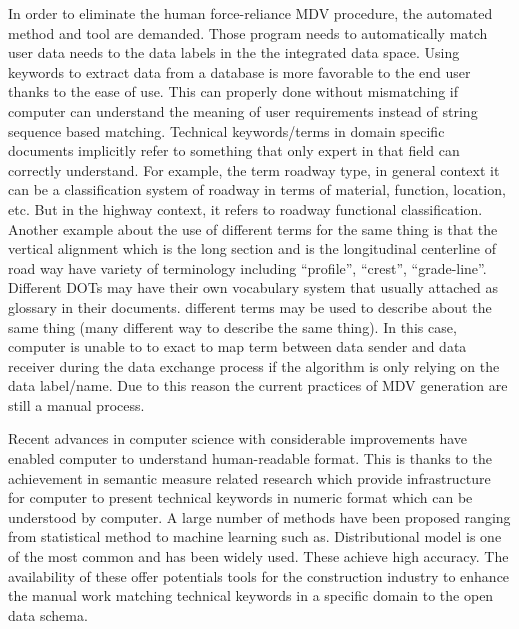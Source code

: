 \documentclass[Journal, InsideFigs, DoubleSpace]{ascelike} %
\begin{document}
In order to eliminate the human force-reliance MDV procedure, the automated method and tool are demanded. Those program needs to automatically match user data needs to the data labels in the the integrated data space. Using keywords to extract data from a database is more favorable to the end user thanks to the ease of use. This can properly done without mismatching if computer can understand the meaning of user requirements instead of string sequence based matching. Technical keywords/terms in domain specific documents implicitly refer to something that only expert in that field can correctly understand. For example, the term roadway type, in general context it can be a classification system of roadway in terms of material, function, location, etc. But in the highway context, it refers to roadway functional classification. Another example about the use of different terms for the same thing is that the vertical alignment which is the long section and is the longitudinal centerline of road way have variety of terminology including ``profile'', ``crest'', ``grade-line''. Different DOTs may have their own vocabulary system that usually attached as glossary in their documents. different terms may be used to describe about the same thing (many different way to describe the same thing). In this case, computer is unable to to exact to map term between data sender and data receiver during the data exchange process if the algorithm is only relying on the data label/name.  Due to this reason the current practices of MDV generation are still a manual process.
\par
Recent advances in computer science with considerable improvements have enabled computer to understand human-readable format. This is thanks to the achievement in semantic measure related research which provide infrastructure for computer to present technical keywords in numeric format which can be understood by computer. A large number of methods have been proposed ranging from statistical method to machine learning such as. Distributional model is one of the most common and has been widely used. These achieve high accuracy. The availability of these offer potentials tools for the construction industry to enhance the manual work matching technical keywords in a specific domain to the open data schema. 
\par
\end{document}
